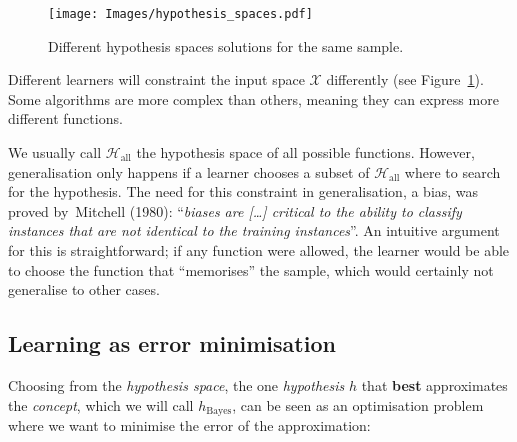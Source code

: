 \documentclass[
  letterpaper,
  12pt,
  british]{tufte-book}
\theoremstyle{plain}
\theoremstyle{definition}
\theoremstyle{plain}
\theoremstyle{remark}
\begin{document}
\begin{figure}

{\centering \texttt{[image: Images/hypothesis\_spaces.pdf]}

}

\caption{\label{fig-hypothesis_spaces}Different hypothesis spaces
solutions for the same sample.}

\end{figure}

Different learners will constraint the input space \(\mathcal{X}\)
differently (see Figure~\ref{fig-hypothesis_spaces}). Some algorithms
are more complex than others, meaning they can express more different
functions.

We usually call \(\mathcal{H}_{\text{all}}\) the hypothesis space of all
possible functions. However, generalisation only happens if a learner
chooses a subset of \(\mathcal{H}_{\text{all}}\) where to search for the
hypothesis. The need for this constraint in generalisation, a bias, was
proved by~Mitchell
(1980):
``\emph{biases are {[}\ldots{]} critical to the ability to classify
instances that are not identical to the training instances}''. An
intuitive argument for this is straightforward; if any function were
allowed, the learner would be able to choose the function that
``memorises'' the sample, which would certainly not generalise to other
cases.

\hypertarget{learning-as-error-minimisation}{%
\subsection{Learning as error
minimisation}\label{learning-as-error-minimisation}}

Choosing from the \emph{hypothesis space}, the one \emph{hypothesis}
\(h\) that \textbf{best} approximates the \emph{concept}, which we will
call \(h_{\text{Bayes}}\), can be seen as an optimisation problem where
we want to minimise the error of the approximation:
\end{document}
